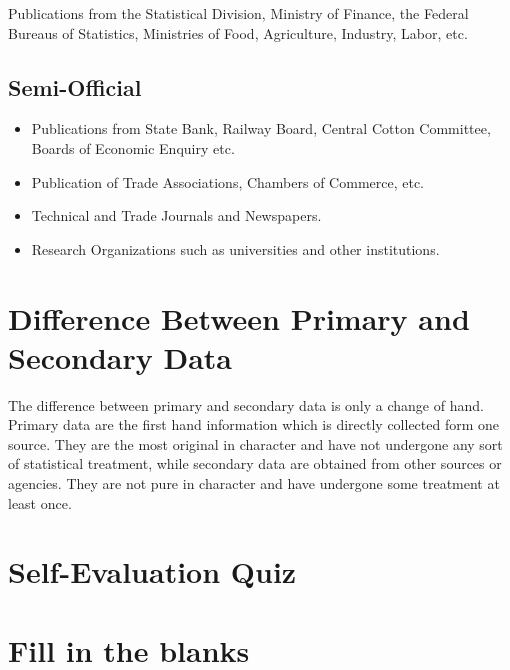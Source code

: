\documentclass[
]{book}
\providecommand{\tightlist}{%
  \setlength{\itemsep}{0pt}\setlength{\parskip}{0pt}}
\begin{document}
Publications from the Statistical Division, Ministry of Finance, the
Federal Bureaus of Statistics, Ministries of Food, Agriculture,
Industry, Labor, etc.

\hypertarget{semi-official}{%
\subsection{Semi-Official}\label{semi-official}}

\begin{itemize}
\tightlist
\item
  Publications from State Bank, Railway Board, Central Cotton
  Committee, Boards of Economic Enquiry etc.\\
\item
  Publication of Trade Associations, Chambers of Commerce, etc.\\
\item
  Technical and Trade Journals and Newspapers.\\
\item
  Research Organizations such as universities and other institutions.
\end{itemize}

\hypertarget{difference-between-primary-and-secondary-data}{%
\section{Difference Between Primary and Secondary Data}\label{difference-between-primary-and-secondary-data}}

The difference between primary and secondary data is only a change of
hand. Primary data are the first hand information which is directly
collected form one source. They are the most original in character and
have not undergone any sort of statistical treatment, while secondary
data are obtained from other sources or agencies. They are not pure in
character and have undergone some treatment at least once.

\hypertarget{self-evaluation-quiz}{%
\section{Self-Evaluation Quiz}\label{self-evaluation-quiz}}

\hypertarget{fill-in-the-blanks}{%
\section*{Fill in the blanks}\label{fill-in-the-blanks}}
\end{document}

